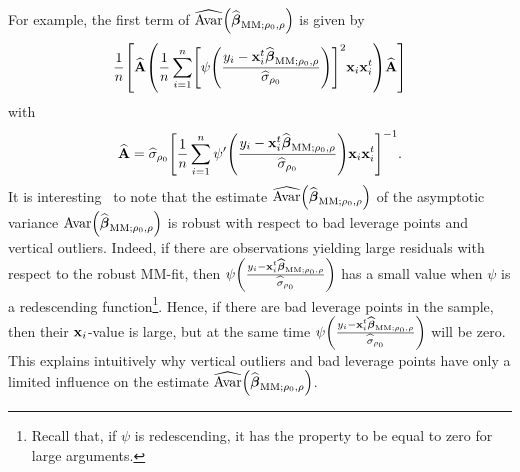For example, the first term of $\sthat{\mathrm{Avar}}\left(  \widehat
{\boldsymbol\beta}_{\mathrm{MM};\rho_{0},\rho}\right)  $ is given by
\[
\frac{1}{n}\left[  \sthat{\mathbf{A}}\left(  \frac{1}{n}\sum_{i=1}%
^{n}\left[  \psi\left(  \frac{y_{i}-\stvec{x}_{i}^{t}\widehat
{\boldsymbol\beta}_{\mathrm{MM};\rho_{0},\rho}}{\sthat{\sigma}_{\rho_{0}}%
}\right)  \right]  ^{2}\stvec{x}_{i}\stvec{x}_{i}^{t}\right)  \widehat
{\mathbf{A}}\right]
\]
with
\[
\sthat{\mathbf{A}}=\sthat{\sigma}_{\rho_{0}}\left[  \frac{1}{n}\sum
_{i=1}^{n}\psi^{\prime}\left(  \frac{y_{i}-\stvec{x}_{i}^{t}\widehat
{\boldsymbol\beta}_{\mathrm{MM};\rho_{0},\rho}}{\sthat{\sigma}_{\rho_{0}}%
}\right)  \stvec{x}_{i}\stvec{x}_{i}^{t}\right]  ^{-1}.
\]
It is interesting \ to note that the estimate $\sthat{\mathrm{Avar}}\left(
\sthat{\boldsymbol\beta}_{\mathrm{MM};\rho_{0},\rho}\right)  $ of the
asymptotic variance $\mathrm{Avar}\left(  \sthat{\boldsymbol\beta%
}_{\mathrm{MM};\rho_{0},\rho}\right)  $ is robust with respect to bad leverage
points and vertical outliers. Indeed, if there are observations yielding large
residuals with respect to the robust MM-fit, then $\psi\left(  \frac
{y_{i}-\stvec{x}_{i}^{t}\sthat{\boldsymbol\beta}_{\mathrm{MM};\rho
_{0},\rho}}{\sthat{\sigma}_{\rho_{0}}}\right)  $ has a small value when
$\psi$ is a redescending function\footnote{Recall that, if $\psi$ is
redescending, it has the property to be equal to zero for large arguments.}.
Hence, if there are bad leverage points in the sample, then their
$\mathbf x_{i}$-value is large, but at the same time $\psi\left(  \frac
{y_{i}-\stvec{x}_{i}^{t}\sthat{\boldsymbol\beta}_{\mathrm{MM};\rho
_{0},\rho}}{\sthat{\sigma}_{\rho_{0}}}\right)  $ will be zero. This explains
intuitively why vertical outliers and bad leverage points have only a limited
influence on the estimate $\sthat{\mathrm{Avar}}\left(  \widehat
{\boldsymbol\beta}_{\mathrm{MM};\rho_{0},\rho}\right)  $.

